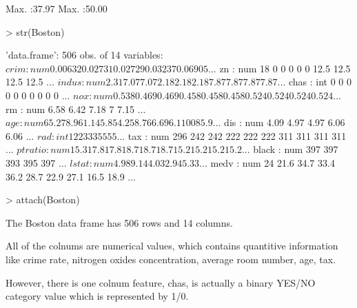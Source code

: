 \documentclass[a4paper]{article}
\begin{document}
\begin{Schunk}
\begin{Soutput}
 Max.   :37.97   Max.   :50.00  
\end{Soutput}
\begin{Sinput}
> str(Boston)
\end{Sinput}
\begin{Soutput}
'data.frame':	506 obs. of  14 variables:
 $ crim   : num  0.00632 0.02731 0.02729 0.03237 0.06905 ...
 $ zn     : num  18 0 0 0 0 0 12.5 12.5 12.5 12.5 ...
 $ indus  : num  2.31 7.07 7.07 2.18 2.18 2.18 7.87 7.87 7.87 7.87 ...
 $ chas   : int  0 0 0 0 0 0 0 0 0 0 ...
 $ nox    : num  0.538 0.469 0.469 0.458 0.458 0.458 0.524 0.524 0.524 0.524 ...
 $ rm     : num  6.58 6.42 7.18 7 7.15 ...
 $ age    : num  65.2 78.9 61.1 45.8 54.2 58.7 66.6 96.1 100 85.9 ...
 $ dis    : num  4.09 4.97 4.97 6.06 6.06 ...
 $ rad    : int  1 2 2 3 3 3 5 5 5 5 ...
 $ tax    : num  296 242 242 222 222 222 311 311 311 311 ...
 $ ptratio: num  15.3 17.8 17.8 18.7 18.7 18.7 15.2 15.2 15.2 15.2 ...
 $ black  : num  397 397 393 395 397 ...
 $ lstat  : num  4.98 9.14 4.03 2.94 5.33 ...
 $ medv   : num  24 21.6 34.7 33.4 36.2 28.7 22.9 27.1 16.5 18.9 ...
\end{Soutput}
\begin{Sinput}
> attach(Boston)
\end{Sinput}
\end{Schunk}

\begin{enumerate}
{
\color{red}
\item The Boston data frame has 506 rows and 14 columns.
\item All of the colnums are numerical values, which contains quantitive information like crime rate, nitrogen oxides concentration, average room number, age, tax.
\item However, there is one colnum feature, chas, is actually a binary YES/NO category value which is represented by 1/0.
}
\end{enumerate}
\end{document}
